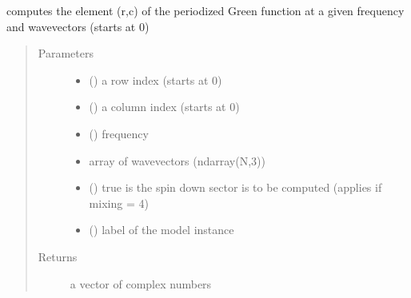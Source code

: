 \documentclass[letterpaper,10pt,english]{sphinxmanual}
\begin{document}

\begin{fulllineitems}
\label{\detokenize{functions:pyqcm.periodized_Green_function_element}}
\sphinxAtStartPar
computes the element (r,c) of the periodized Green function at a given frequency and wavevectors (starts at 0)
\begin{quote}\begin{description}
\item[{Parameters}] \leavevmode\begin{itemize}
\item {} 
\sphinxAtStartPar
{} () \textendash{} a row index (starts at 0)

\item {} 
\sphinxAtStartPar
{} () \textendash{} a column index (starts at 0)

\item {} 
\sphinxAtStartPar
{} () \textendash{} frequency

\item {} 
\sphinxAtStartPar
{} \textendash{} array of wavevectors (ndarray(N,3))

\item {} 
\sphinxAtStartPar
{} () \textendash{} true is the spin down sector is to be computed (applies if mixing = 4)

\item {} 
\sphinxAtStartPar
{} () \textendash{} label of the model instance

\end{itemize}

\item[{Returns}] \leavevmode
\sphinxAtStartPar
a vector of complex numbers

\end{description}\end{quote}

\end{fulllineitems}
\end{document}
